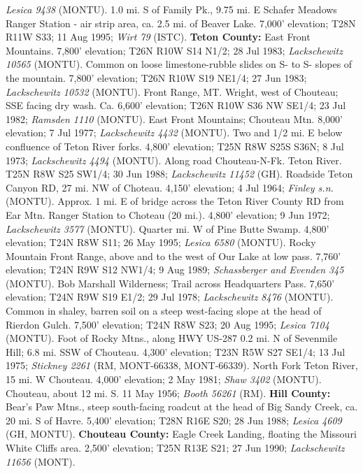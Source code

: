 \textit{Lesica 9438} (MONTU).
1.0 mi. S of Family Pk., 9.75 mi. E Schafer Meadows Ranger Station - air strip
area, ca. 2.5 mi. of Beaver Lake. 7,000' elevation; T28N R11W S33; 11 Aug 1995;
\textit{Wirt 79} (ISTC).
  \textbf{Teton County:}
East Front Mountains. 7,800' elevation; T26N R10W S14 N1/2; 28 Jul 1983;
\textit{Lackschewitz 10565} (MONTU).
Common on loose limestone-rubble slides on S- to S- slopes of the mountain.
7,800' elevation; T26N R10W S19 NE1/4; 27 Jun 1983;
\textit{Lackschewitz 10532} (MONTU).
Front Range, MT. Wright, west of Chouteau; SSE facing dry wash. Ca. 6,600'
elevation; T26N R10W S36 NW SE1/4; 23 Jul 1982; \textit{Ramsden 1110} (MONTU).
East Front Mountains; Chouteau Mtn. 8,000' elevation; 7 Jul 1977;
\textit{Lackschewitz 4432} (MONTU).
Two and 1/2 mi. E below confluence of Teton River forks. 4,800' elevation;
T25N R8W S25S S36N; 8 Jul 1973; \textit{Lackschewitz 4494} (MONTU).
Along road Chouteau-N-Fk. Teton River. T25N R8W S25 SW1/4; 30 Jun 1988;
\textit{Lackschewitz 11452} (GH).
Roadside Teton Canyon RD, 27 mi. NW of Choteau. 4,150' elevation;
4 Jul 1964; \textit{Finley s.n.} (MONTU).
Approx. 1 mi. E of bridge across the Teton River County RD from Ear Mtn.
Ranger Station to Choteau (20 mi.). 4,800' elevation; 9 Jun 1972;
\textit{Lackschewitz 3577} (MONTU).
Quarter mi. W of Pine Butte Swamp. 4,800' elevation; T24N R8W S11; 26 May 1995;
\textit{Lesica 6580} (MONTU).
Rocky Mountain Front Range, above and to the west of Our Lake at low pass.
7,760' elevation; T24N R9W S12 NW1/4; 9 Aug 1989;
\textit{Schassberger and Evenden 345} (MONTU).
Bob Marshall Wilderness; Trail across Headquarters Pass. 7,650' elevation;
T24N R9W S19 E1/2; 29 Jul 1978; \textit{Lackschewitz 8476} (MONTU).
Common in shaley, barren soil on a steep west-facing slope at the head of
Rierdon Gulch. 7,500' elevation; T24N R8W S23; 20 Aug 1995;
\textit{Lesica 7104} (MONTU).
Foot of Rocky Mtns., along HWY US-287 0.2 mi. N of Sevenmile Hill; 6.8 mi. SSW
of Chouteau. 4,300' elevation; T23N R5W S27 SE1/4; 13 Jul 1975;
\textit{Stickney 2261} (RM, MONT-66338, MONT-66339).
North Fork Teton River, 15 mi. W Chouteau. 4,000' elevation; 2 May 1981;
\textit{Shaw 3402} (MONTU).
Chouteau, about 12 mi. S. 11 May 1956; \textit{Booth 56261} (RM).
  \textbf{Hill County:}
Bear's Paw Mtns., steep south-facing roadcut at the head of Big Sandy Creek,
ca. 20 mi. S of Havre. 5,400' elevation; T28N R16E S20; 28 Jun 1988;
\textit{Lesica 4609} (GH, MONTU).
  \textbf{Chouteau County:}
Eagle Creek Landing, floating the Missouri White Cliffs area. 2,500' elevation;
T25N R13E S21; 27 Jun 1990; \textit{Lackschewitz 11656} (MONT).
